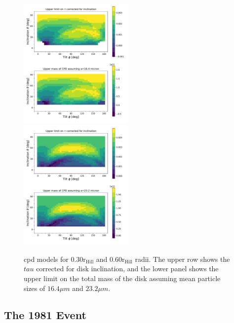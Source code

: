 \documentclass[longauth]{aa} %
\newcommand{\rhill}{$\mathrm{r_{Hill}}$} %
\begin{document}
\begin{figure}[htb]
    \includegraphics[width=0.50\textwidth]{diskfit_taumass_030.pdf}
    \includegraphics[width=0.50\textwidth]{diskfit_taumass_060.pdf}
    \caption{\ac{cpd} models for 0.30\rhill{} and  0.60\rhill{} radii. The upper row shows the $tau$ corrected for disk inclination, and the lower panel shows the upper limit on the total mass of the disk assuming mean particle sizes of $16.4\mu m$ and $23.2\mu m$.}
    \label{totalcpd}
\end{figure}


\subsection{The 1981 Event}
\end{document}
